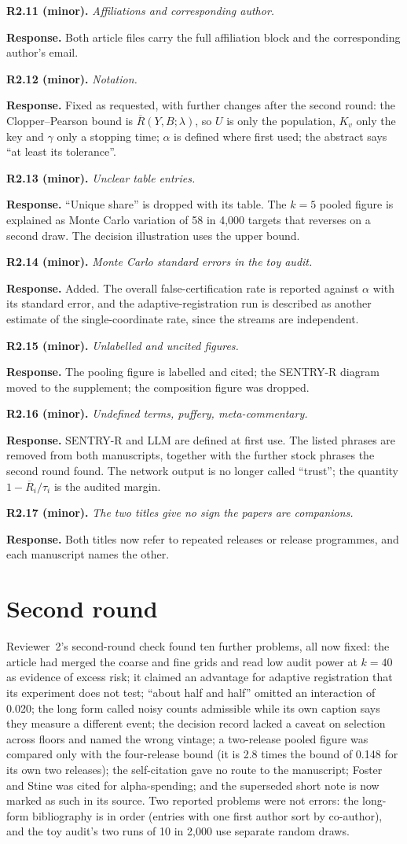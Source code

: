 \documentclass[11pt,a4paper]{article}
\newcommand{\point}[2]{\par\medskip\textbf{#1} \emph{#2}\par}
\newcommand{\reply}{\textbf{Response.} }
\begin{document}
\point{R2.11 (minor).}{Affiliations and corresponding author.}
\reply Both article files carry the full affiliation block and the corresponding
author's email.

\point{R2.12 (minor).}{Notation.}
\reply Fixed as requested, with further changes after the second round: the
Clopper--Pearson bound is $\overline{R}(Y,B;\lambda)$, so $U$ is only the population,
$K_v$ only the key and $\gamma$ only a stopping time; $\alpha$ is defined where first
used; the abstract says ``at least its tolerance''.

\point{R2.13 (minor).}{Unclear table entries.}
\reply ``Unique share'' is dropped with its table. The $k=5$ pooled figure is explained
as Monte Carlo variation of 58 in 4,000 targets that reverses on a second draw. The
decision illustration uses the upper bound.

\point{R2.14 (minor).}{Monte Carlo standard errors in the toy audit.}
\reply Added. The overall false-certification rate is reported against $\alpha$ with its
standard error, and the adaptive-registration run is described as another estimate of
the single-coordinate rate, since the streams are independent.

\point{R2.15 (minor).}{Unlabelled and uncited figures.}
\reply The pooling figure is labelled and cited; the SENTRY-R diagram moved to the
supplement; the composition figure was dropped.

\point{R2.16 (minor).}{Undefined terms, puffery, meta-commentary.}
\reply SENTRY-R and LLM are defined at first use. The listed phrases are removed from
both manuscripts, together with the further stock phrases the second round found. The
network output is no longer called ``trust''; the quantity $1-\overline{R}_i/\tau_i$ is
the audited margin.

\point{R2.17 (minor).}{The two titles give no sign the papers are companions.}
\reply Both titles now refer to repeated releases or release programmes, and each
manuscript names the other.

\section*{Second round}
Reviewer~2's second-round check found ten further problems, all now fixed: the article
had merged the coarse and fine grids and read low audit power at $k=40$ as evidence of
excess risk; it claimed an advantage for adaptive registration that its experiment does
not test; ``about half and half'' omitted an interaction of 0.020; the long form called
noisy counts admissible while its own caption says they measure a different event; the
decision record lacked a caveat on selection across floors and named the wrong vintage;
a two-release pooled figure was compared only with the four-release bound (it is 2.8
times the bound of 0.148 for its own two releases); the self-citation gave no route to
the manuscript; Foster and Stine was cited for alpha-spending; and the superseded short
note is now marked as such in its source. Two reported problems were not errors: the
long-form bibliography is in order (entries with one first author sort by co-author),
and the toy audit's two runs of 10 in 2,000 use separate random draws.
\end{document}
